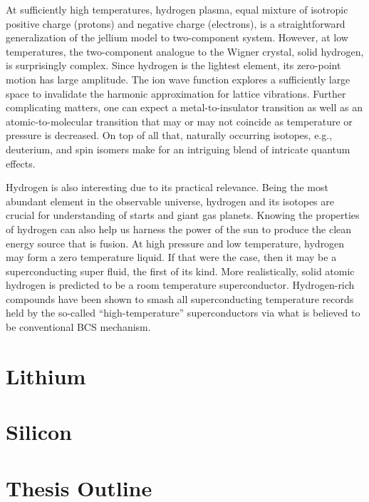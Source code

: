 At sufficiently high temperatures, hydrogen plasma, equal mixture of isotropic positive charge (protons) and negative charge (electrons), is a straightforward generalization of the jellium model to two-component system. However, at low temperatures, the two-component analogue to the Wigner crystal, solid hydrogen, is surprisingly complex.
Since hydrogen is the lightest element, its zero-point motion has large amplitude. The ion wave function explores a sufficiently large space to invalidate the harmonic approximation for lattice vibrations.
Further complicating matters, one can expect a metal-to-insulator transition as well as an atomic-to-molecular transition that may or may not coincide as temperature or pressure is decreased.
On top of all that, naturally occurring isotopes, e.g., deuterium, and spin isomers make for an intriguing blend of intricate quantum effects.

Hydrogen is also interesting due to its practical relevance. Being the most abundant element in the observable universe, hydrogen and its isotopes are crucial for understanding of starts and giant gas planets. Knowing the properties of hydrogen can also help us harness the power of the sun to produce the clean energy source that is fusion.
At high pressure and low temperature, hydrogen may form a zero temperature liquid. If that were the case, then it may be a superconducting super fluid, the first of its kind. More realistically, solid atomic hydrogen is predicted to be a room temperature superconductor. Hydrogen-rich compounds have been shown to smash all superconducting temperature records held by the so-called ``high-temperature'' superconductors via what is believed to be conventional BCS mechanism.

\section{Lithium}

\section{Silicon}

\section{Thesis Outline}